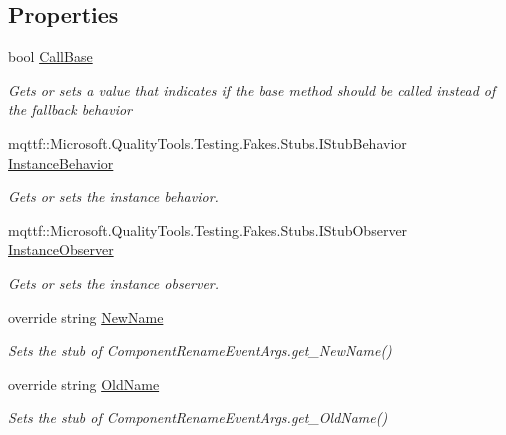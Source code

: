 \subsection*{Properties}
\begin{DoxyCompactItemize}
\item 
bool \hyperlink{class_system_1_1_component_model_1_1_design_1_1_fakes_1_1_stub_component_rename_event_args_adf6f2c6d6224ec229bae8db0d46f9584}{Call\-Base}
\begin{DoxyCompactList}\small\item\em Gets or sets a value that indicates if the base method should be called instead of the fallback behavior\end{DoxyCompactList}\item 
mqttf\-::\-Microsoft.\-Quality\-Tools.\-Testing.\-Fakes.\-Stubs.\-I\-Stub\-Behavior \hyperlink{class_system_1_1_component_model_1_1_design_1_1_fakes_1_1_stub_component_rename_event_args_a4c9863ed4a6ec2b215d44b9791b1c591}{Instance\-Behavior}
\begin{DoxyCompactList}\small\item\em Gets or sets the instance behavior.\end{DoxyCompactList}\item 
mqttf\-::\-Microsoft.\-Quality\-Tools.\-Testing.\-Fakes.\-Stubs.\-I\-Stub\-Observer \hyperlink{class_system_1_1_component_model_1_1_design_1_1_fakes_1_1_stub_component_rename_event_args_aad1f4867dcf68de0f022083c700b3edb}{Instance\-Observer}
\begin{DoxyCompactList}\small\item\em Gets or sets the instance observer.\end{DoxyCompactList}\item 
override string \hyperlink{class_system_1_1_component_model_1_1_design_1_1_fakes_1_1_stub_component_rename_event_args_a3292efc847982cef08e3f5f843dcd905}{New\-Name}
\begin{DoxyCompactList}\small\item\em Sets the stub of Component\-Rename\-Event\-Args.\-get\-\_\-\-New\-Name()\end{DoxyCompactList}\item 
override string \hyperlink{class_system_1_1_component_model_1_1_design_1_1_fakes_1_1_stub_component_rename_event_args_abefa07ac2ae80b6fd2601ecf4b2edec5}{Old\-Name}
\begin{DoxyCompactList}\small\item\em Sets the stub of Component\-Rename\-Event\-Args.\-get\-\_\-\-Old\-Name()\end{DoxyCompactList}\end{DoxyCompactItemize}


